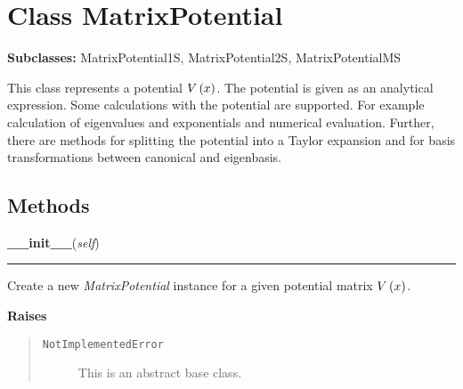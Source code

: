 
\section{Class MatrixPotential}

    \label{MatrixPotential:MatrixPotential}
\textbf{Subclasses:}
MatrixPotential1S,
MatrixPotential2S,
MatrixPotentialMS

This class represents a potential $V\left( x \right)$. The
potential is given as an analytical expression. Some calculations with the
potential are supported. For example calculation of eigenvalues and
exponentials and numerical evaluation. Further, there are methods for
splitting the potential into a Taylor expansion and for basis
transformations between canonical and eigenbasis.



  \subsection{Methods}

    \label{MatrixPotential:MatrixPotential:__init__}

    \vspace{0.5ex}

\hspace{.8\funcindent}\begin{boxedminipage}{\funcwidth}

    \raggedright \textbf{\_\_init\_\_}(\textit{self})

    \vspace{-1.5ex}

    \rule{\textwidth}{0.5\fboxrule}
\setlength{\parskip}{2ex}
    Create a new \textit{MatrixPotential} instance for a given potential
    matrix $V\left( x \right)$.

\setlength{\parskip}{1ex}
      \textbf{Raises}
    \vspace{-1ex}

      \begin{quote}
        \begin{description}

          \item[\texttt{NotImplementedError}]

          This is an abstract base class.

        \end{description}

      \end{quote}

    \end{boxedminipage}

